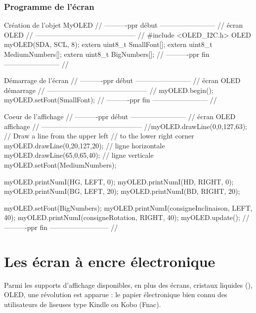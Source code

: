 \subsection{Programme de l'écran}
\begin{Cpp}{Création de l'objet MyOLED}
    // ----------ppr début ------------------------
    // écran OLED
    // --------------------------------------------
    //
    #include <OLED_I2C.h>
    OLED  myOLED(SDA, SCL, 8);
    extern uint8_t SmallFont[];
    extern uint8_t MediumNumbers[];
    extern uint8_t BigNumbers[];
    // ----------ppr fin   ------------------------
    //
\end{Cpp}

\begin{Cpp}{Démarrage de l'écran}
    // 
----------ppr début ------------------------
// écran OLED démarrage
// --------------------------------------------
//
myOLED.begin();
myOLED.setFont(SmallFont);
// ----------ppr fin ------------------------
//
\end{Cpp}

\begin{Cpp}{Coeur de l'affichage}
    // ----------ppr début ------------------------
    // écran OLED affichage
    // --------------------------------------------
    //myOLED.drawLine(0,0,127,63); 
    // Draw a line from the upper left 
    // to the lower right corner
      myOLED.drawLine(0,20,127,20);  // ligne horizontale 
      myOLED.drawLine(65,0,65,40);   // ligne verticale
      myOLED.setFont(MediumNumbers);      
  
      myOLED.printNumI(HG, LEFT, 0);
      myOLED.printNumI(HD, RIGHT, 0);
      myOLED.printNumI(BG, LEFT, 20);
      myOLED.printNumI(BD, RIGHT, 20);
  
      myOLED.setFont(BigNumbers);
      myOLED.printNumI(consigneInclinaison, LEFT, 40);
      myOLED.printNumI(consigneRotation, RIGHT, 40);
      myOLED.update();
    // ----------ppr fin --------------------------
    //
  
\end{Cpp}



\chapter{Les écran à encre électronique}

Parmi les supports d'affichage disponibles, en plus des écrans, cristaux liquides 
(), OLED, une révolution est apparue : le papier électronique  
bien connu des utilisateurs de liseuses type Kindle ou Kobo (Fnac).

